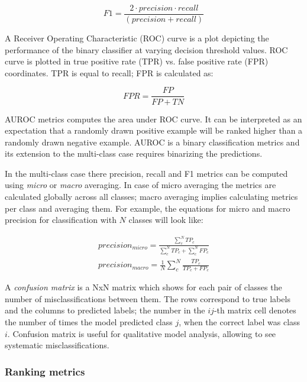 \begin{equation}
    F1 = \frac{2 \cdot precision \cdot recall}{(precision + recall)}
\end{equation}

 A Receiver Operating Characteristic (ROC) curve is a plot depicting the performance of the binary classifier at varying decision threshold values. ROC curve is plotted in true positive rate (TPR) vs. false positive rate (FPR) coordinates. TPR is equal to recall; FPR is calculated as:

\begin{equation}
    FPR = \frac{FP}{FP + TN}
\end{equation}

AUROC metrics computes the area under ROC curve. It can be interpreted as an expectation that a randomly drawn positive example will be ranked higher than a randomly drawn negative example. AUROC is a binary classification metrics and its extension to the multi-class case requires binarizing the predictions.

 In the multi-class case there precision, recall and F1 metrics can be computed using \textit{micro} or \textit{macro} averaging. In case of micro averaging the metrics are calculated globally across all classes; macro averaging implies calculating metrics per class and averaging them. For example, the equations for micro and macro precision for classification with $N$ classes will look like:

\begin{align}
    precision_{micro} = \frac{\sum_{c}^N TP_c}{\sum_{c}^N TP_c + \sum_{c}^N FP_c} \\
    precision_{macro} = \frac{1}{N}\sum_{c}^N \frac{TP_c}{TP_c + FP_c}
\end{align}

A \textit{confusion matrix} is a NxN matrix which shows for each pair of classes the number of misclassifications between them. The rows correspond to true labels and the columns to predicted labels; the number in the $ij$-th matrix cell denotes the number of times the model predicted class $j$, when the correct label was class $i$. Confusion matrix is useful for qualitative model analysis, allowing to see systematic misclassifications.

\subsubsection{Ranking metrics}

